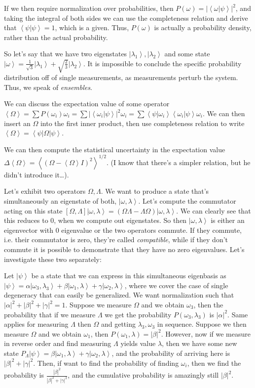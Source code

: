 \documentclass[10pt]{report}
\newcommand{\bra}[1]{\left<#1\right|}
\newcommand{\ket}[1]{\left|#1\right>}
\newcommand{\dotp}[2]{\left<#1\left.\right|#2\right>}
\newcommand{\abs}[1]{\left|#1\right|}
\newcommand{\expvalue}[1]{\left<#1\right>}
\begin{document}
If we then require normalization over probabilities, then $P(\omega) = \abs{\dotp{\omega}{\psi}}^2$, and taking the integral of both sides we can use the completeness relation and derive that $\dotp{\psi}{\psi}=1$, which is a given. Thus, $P(\omega)$ is actually a probability density, rather than the actual probability.

So let's say that we have two eigenstates $\ket{\lambda_1},\ket{\lambda_2}$ and some state $\ket{\omega}=\frac{1}{\sqrt{3}}\ket{\lambda_1}+\sqrt{\frac{2}{3}}\ket{\lambda_2}$. It is impossible to conclude the specific probability distribution off of single measurements, as measurements perturb the system. Thus, we speak of \emph{ensembles}. 

We can discuss the expectation value of some operator $\expvalue{\Omega}=\sum P(\omega_i)\omega_i = \sum \abs{\dotp{\omega_i}{\psi}}^2\omega_i = \sum \dotp{\psi}{\omega_i}\dotp{\omega_i}{\psi}\omega_i$. We can then insert an $\Omega$ into the first inner product, then use completeness relation to write $\expvalue{\Omega}=\bra{\psi}\Omega\ket{\psi}$. 

We can then compute the statistical uncertainty in the expectation value $\Delta \expvalue{\Omega} = \expvalue{\left(\Omega-\expvalue{\Omega}I\right)^2}^{1/2}$. (I know that there's a simpler relation, but he didn't introduce it\dots). 

Let's exhibit two operators $\Omega,\Lambda$. We want to produce a state that's simultaneously an eigenstate of both, $\ket{\omega,\lambda}$. Let's compute the commutator acting on this state $\left[ \Omega,\Lambda \right]\ket{\omega,\lambda}=\left( \Omega\Lambda-\Lambda\Omega \right)\ket{\omega,\lambda}$. We can clearly see that this reduces to $0$, when we compute out eigenstates. So then $\ket{\omega,\lambda}$ is either an eigenvector with $0$ eigenvalue or the two operators commute. If they commute, i.e. their commutator is zero, they're called \emph{compatible}, while if they don't commute it is possible to demonstrate that they have no zero eigenvalues. Let's investigate these two separately:

Let $\ket{\psi}$ be a state that we can express in this simultaneous eigenbasis as $\ket{\psi} = \alpha\ket{\omega_3,\lambda_3}+\beta\ket{\omega_1,\lambda}+\gamma\ket{\omega_2,\lambda}$, where we cover the case of single degeneracy that can easily be generalized. We want normalization such that $|\alpha|^2+|\beta|^2+|\gamma|^2=1$. Suppose we measure $\Omega$ and we obtain $\omega_3$, then the probability that if we measure $\Lambda$ we get the probability $P(\omega_3,\lambda_3)$ is $|\alpha|^2$. Same applies for measuring $\Lambda$ then $\Omega$ and getting $\lambda_3,\omega_3$ in sequence. Suppose we then measure $\Omega$ and we obtain $\omega_1$, then $P(\omega_1,\lambda)=|\beta|^2$. However, now if we measure in reverse order and find measuring $\Lambda$ yields value $\lambda$, then we have some new state $P_\Lambda\ket{\psi}=\beta\ket{\omega_1,\lambda}+\gamma\ket{\omega_2,\lambda}$, and the probability of arriving here is $|\beta|^2+|\gamma|^2$. Then, if want to find the probability of finding $\omega_i$, then we find the probability is $\frac{|\beta|^2}{|\beta|^2+|\gamma|^2}$, and the cumulative probability is amazingly still $|\beta|^2$.
\end{document}
